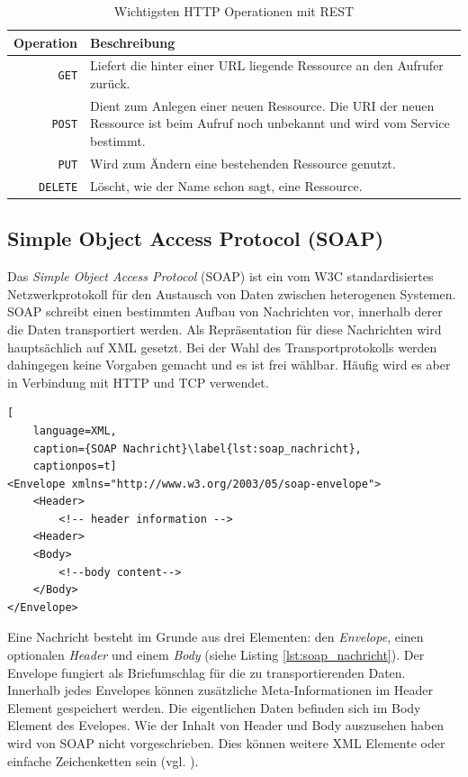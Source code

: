 \begin{table}[ht]
\centering
\caption{Wichtigsten HTTP Operationen mit REST} 
\begin{tabular}{r|p{12cm}}
    \textbf{Operation} & 
    \textbf{Beschreibung} \\ 
    \hline
    \texttt{GET} & 
    Liefert die hinter einer URL liegende Ressource an den Aufrufer zurück.\\
    
    \texttt{POST} & 
    Dient zum Anlegen einer neuen Ressource. Die URI der neuen Ressource ist beim Aufruf noch unbekannt und wird vom Service bestimmt. \\

    \texttt{PUT} & 
    Wird zum Ändern eine bestehenden Ressource genutzt. \\
    
    \texttt{DELETE} &
    Löscht, wie der Name schon sagt, eine Ressource.
\end{tabular}
\label{tbl:rest_oprations}
\end{table} 
     

\subsection{Simple Object Access Protocol (SOAP)} %
\label{sub:soap}

Das \emph{Simple Object Access Protocol} (SOAP) ist ein vom W3C standardisiertes Netzwerkprotokoll für den Austausch von Daten zwischen heterogenen Systemen. SOAP schreibt einen bestimmten Aufbau von Nachrichten vor, innerhalb derer die Daten transportiert werden. Als Repräsentation für diese Nachrichten wird hauptsächlich auf XML gesetzt. Bei der Wahl des Transportprotokolls werden dahingegen keine Vorgaben gemacht und es ist frei wählbar. Häufig wird es aber in Verbindung mit HTTP und TCP verwendet. 

\begin{lstlisting}[
    language=XML,
    caption={SOAP Nachricht}\label{lst:soap_nachricht},
    captionpos=t]
<Envelope xmlns="http://www.w3.org/2003/05/soap-envelope">
    <Header>
        <!-- header information -->
    <Header> 
    <Body>
        <!--body content-->
    </Body>
</Envelope>
\end{lstlisting}

Eine Nachricht besteht im Grunde aus drei Elementen: den \emph{Envelope}, einen optionalen \emph{Header} und einem \emph{Body} (siehe Listing \ref{lst:soap_nachricht}). Der Envelope fungiert als Briefumschlag für die zu transportierenden Daten. Innerhalb jedes Envelopes können zusätzliche Meta-Informationen im Header Element gespeichert werden. Die eigentlichen Daten befinden sich im Body Element des Evelopes. Wie der Inhalt von Header und Body auszusehen haben wird von SOAP nicht vorgeschrieben. Dies können weitere XML Elemente oder einfache Zeichenketten sein (vgl. \cite{Mitra2007}). 

